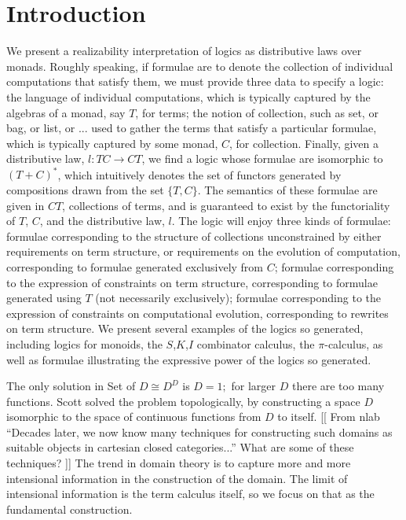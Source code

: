 \documentclass[]{acm_proc_article-sp}
\numberwithin{equation}{subsection}
\newcommand{\pic}{$\pi$-calculus}
\newcommand{\paperversion}{Draft Version 0.1 - Jan 7, 2015}
\newenvironment{toc}
{
\begin{list}{}{
   \setlength{\leftmargin}{0.4in}
   \setlength{\rightmargin}{0.6in}
   \setlength{\parskip}{0pt}
 } \item }
{\end{list}}
\begin{document}



\section{Introduction}

We present a realizability interpretation of logics as distributive
laws over monads. Roughly speaking, if formulae are to denote the
collection of individual computations that satisfy them, we must
provide three data to specify a logic: the language of individual
computations, which is typically captured by the algebras of a monad,
say $T$, for terms; the notion of collection, such as set, or bag, or
list, or ... used to gather the terms that satisfy a particular
formulae, which is typically captured by some monad, $C$, for
collection. Finally, given a distributive law, $l : TC \rightarrow
CT$, we find a logic whose formulae are isomorphic to $(T+C)^{*}$,
which intuitively denotes the set of functors generated by
compositions drawn from the set $\{T,C\}$. The semantics of these
formulae are given in $CT$, collections of terms, and is guaranteed to
exist by the functoriality of $T$, $C$, and the distributive law,
$l$. The logic will enjoy three kinds of formulae: formulae
corresponding to the structure of collections unconstrained by either
requirements on term structure, or requirements on the evolution of
computation, corresponding to formulae generated exclusively from $C$;
formulae corresponding to the expression of constraints on term
structure, corresponding to formulae generated using $T$ (not
necessarily exclusively); formulae corresponding to the expression of
constraints on computational evolution, corresponding to rewrites on
term structure. We present several examples of the logics so
generated, including logics for monoids, the $S$,$K$,$I$ combinator
calculus, the {\pic}, as well as formulae illustrating the expressive
power of the logics so generated.

The only solution in Set of $D \cong D^D$ is $D=1;$ for larger $D$
there are too many functions.  Scott solved the problem topologically,
by constructing a space $D$ isomorphic to the space of continuous
functions from $D$ to itself. [[ From nlab ``Decades later, we now
know many techniques for constructing such domains as suitable objects
in cartesian closed categories...''  What are some of these
techniques? ]]  The trend in domain theory is to capture more and more
intensional information in the construction of the domain.  The limit
of intensional information is the term calculus itself, so we focus on
that as the fundamental construction.
\end{document}
